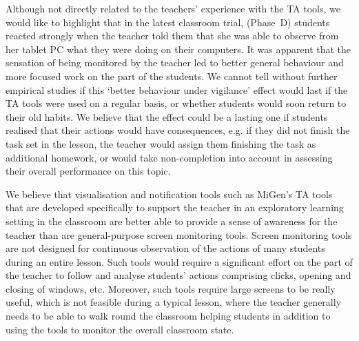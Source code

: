 Although not directly related to the teachers' experience with the TA
tools, we would like to highlight that in the latest classroom trial, 
(Phase~D) students reacted strongly when the teacher 
told them that she was able to observe from her tablet PC what they were 
doing on their computers. %
It was apparent that the sensation of being monitored by the teacher 
led to better general behaviour and more focused work on the part of 
the students. 
We cannot tell without further empirical studies if this 
`better behaviour under vigilance' effect 
would last if the TA tools were used on a regular basis, or whether
students would soon return to their old habits. 
We believe that the effect could be a lasting one if students realised that their
actions would have consequences, e.g. if they did not finish
the task set in the lesson, the teacher would assign them finishing the task
as additional homework, or would take non-completion into account in assessing
their overall performance on this topic. 

We believe that visualisation and notification tools such as MiGen's TA tools 
that are developed specifically to support the teacher in an exploratory learning setting 
in the classroom are better able to provide a sense of awareness for the teacher 
than are general-purpose screen monitoring tools.
Screen monitoring tools are not designed for continuous observation 
of the actions of many students during an entire lesson. 
Such tools would require a significant effort
on the part of the teacher to follow and analyse students' actions
comprising clicks, opening and closing of windows, etc. Moreover, such
tools require large screens to be really useful, which is not feasible
during a typical lesson, where the teacher generally needs to be able
to walk round the classroom helping students in addition to using the
tools to monitor the overall classroom state. 

